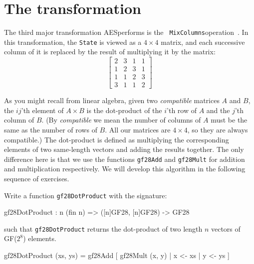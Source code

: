\section{The {} transformation}
\label{sec:aesmixcolumns}

The third major transformation AES\indAES performs is the {\tt
  MixColumns}\indAESMixColumns operation~\cite[Section 5.1.3]{aes}.
In this transformation, the {\tt State} is viewed as a $4\times4$
matrix, and each successive column of it is replaced by the result of
multiplying it by the matrix:
$$
\left[ \begin{array}{cccc} 2 & 3 & 1 & 1 \\ 1 & 2 & 3 & 1 \\ 1 & 1 & 2 & 3 \\ 3 & 1 & 1 & 2 \end{array} \right]
$$

As you might recall from linear algebra, given two \emph{compatible}
matrices $A$ and $B$, the $ij$'th element of $A\times B$ is the
dot-product of the $i$'th row of $A$ and the $j$'th column of $B$.
(By \emph{compatible} we mean the number of columns of $A$ must be the
same as the number of rows of $B$.  All our matrices are $4\times 4$,
so they are always compatible.)  The dot-product is defined as
multiplying the corresponding elements of two same-length vectors and
adding the results together. The only difference here is that we use
the functions {\tt gf28Add} and {\tt gf28Mult} for addition and
multiplication respectively. We will develop this algorithm in the
following sequence of exercises.

\begin{Exercise}\label{ex:aesmc:0}
Write a function {\tt gf28DotProduct} with the signature:
\begin{code}
  gf28DotProduct : {n} (fin n) => ([n]GF28, [n]GF28) -> GF28
\end{code}
such that {\tt gf28DotProduct} returns the dot-product of two length $n$ vectors of GF($2^8$) elements.
\end{Exercise}
\begin{Answer}
\begin{code}
  gf28DotProduct (xs, ys) = gf28Add [ gf28Mult (x, y) | x <- xs
                                                      | y <- ys
                                    ]
\end{code}
\end{Answer}

